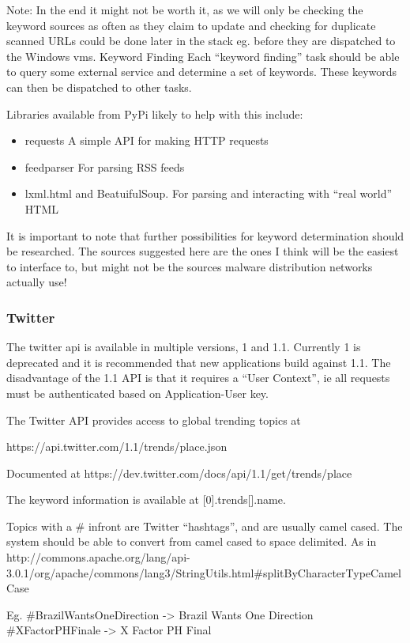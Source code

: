 Note: In the end it might not be worth it, as we will only be checking the keyword sources as often as they claim to update and checking for duplicate scanned URLs could be done later in the stack eg. before they are dispatched to the Windows vms.
Keyword Finding
Each ``keyword finding'' task should be able to query some external service and determine a set of keywords. These keywords can then be dispatched to other tasks.

Libraries available from PyPi likely to help with this include:

\begin{itemize}
    \item requests A simple API for making HTTP requests
    \item feedparser For parsing RSS feeds
    \item lxml.html and BeatuifulSoup. For parsing and interacting with ``real world'' HTML
\end{itemize}

It is important to note that further possibilities for keyword determination should be researched. The sources suggested here are the ones I think will be the easiest to interface to, but might not be the sources malware distribution networks actually use!

\subsubsection{Twitter}
The twitter api is available in multiple versions, 1 and 1.1. Currently 1 is deprecated and it is recommended that new applications build against 1.1.  The disadvantage of the 1.1 API is that it requires a ``User Context'', ie all requests must be authenticated based on Application-User key.

The Twitter API provides access to global trending topics at     

https://api.twitter.com/1.1/trends/place.json

Documented at https://dev.twitter.com/docs/api/1.1/get/trends/place

The keyword information is available at [0].trends[].name.

Topics with a # infront are Twitter ``hashtags'', and are usually camel cased. The system should be able to convert from camel cased to space delimited. As in http://commons.apache.org/lang/api-3.0.1/org/apache/commons/lang3/StringUtils.html#splitByCharacterTypeCamelCase%

Eg. #BrazilWantsOneDirection -> Brazil Wants One Direction
#XFactorPHFinale -> X Factor PH Final

